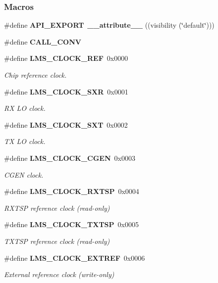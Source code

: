 \subsubsection*{Macros}
\begin{DoxyCompactItemize}
\item 
\#define {\bf A\+P\+I\+\_\+\+E\+X\+P\+O\+RT}~{\bf \+\_\+\+\_\+attribute\+\_\+\+\_\+} ((visibility (\char`\"{}default\char`\"{})))
\item 
\#define {\bf C\+A\+L\+L\+\_\+\+C\+O\+NV}
\item 
\#define {\bf L\+M\+S\+\_\+\+C\+L\+O\+C\+K\+\_\+\+R\+EF}~0x0000
\begin{DoxyCompactList}\small\item\em Chip reference clock. \end{DoxyCompactList}\item 
\#define {\bf L\+M\+S\+\_\+\+C\+L\+O\+C\+K\+\_\+\+S\+XR}~0x0001
\begin{DoxyCompactList}\small\item\em RX LO clock. \end{DoxyCompactList}\item 
\#define {\bf L\+M\+S\+\_\+\+C\+L\+O\+C\+K\+\_\+\+S\+XT}~0x0002
\begin{DoxyCompactList}\small\item\em TX LO clock. \end{DoxyCompactList}\item 
\#define {\bf L\+M\+S\+\_\+\+C\+L\+O\+C\+K\+\_\+\+C\+G\+EN}~0x0003
\begin{DoxyCompactList}\small\item\em C\+G\+EN clock. \end{DoxyCompactList}\item 
\#define {\bf L\+M\+S\+\_\+\+C\+L\+O\+C\+K\+\_\+\+R\+X\+T\+SP}~0x0004
\begin{DoxyCompactList}\small\item\em R\+X\+T\+SP reference clock (read-\/only) \end{DoxyCompactList}\item 
\#define {\bf L\+M\+S\+\_\+\+C\+L\+O\+C\+K\+\_\+\+T\+X\+T\+SP}~0x0005
\begin{DoxyCompactList}\small\item\em T\+X\+T\+SP reference clock (read-\/only) \end{DoxyCompactList}\item 
\#define {\bf L\+M\+S\+\_\+\+C\+L\+O\+C\+K\+\_\+\+E\+X\+T\+R\+EF}~0x0006
\begin{DoxyCompactList}\small\item\em External reference clock (write-\/only) \end{DoxyCompactList}\item 

\end{DoxyCompactItemize}
